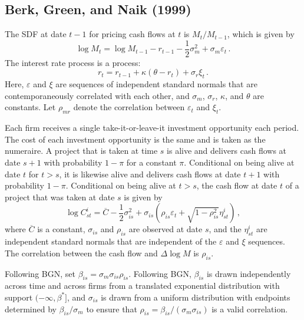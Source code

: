 \clearpage
\appendixpage
\begin{appendices}



\section{Berk, Green, and Naik (1999)}


The SDF at date $t-1$ for pricing cash flows at $t$ is $M_t/M_{t-1}$, which is given by
\begin{equation}\label{logsdf}
\log M_{t} = \log M_{t-1} - r_{t-1} - \frac{1}{2}\sigma_m^2 + \sigma_m \varepsilon_{t}\,.
\end{equation}
The interest rate process is a \cite{vasicek} process:
\begin{equation}\label{interestrate}
r_{t} = r_{t-1} + \kappa(\theta - r_t) + \sigma_r \xi_{t}\,.
\end{equation}
Here, $\varepsilon$ and $\xi$ are sequences of independent standard normals that are contemporaneously correlated with each other, and $\sigma_m$, $\sigma_r$, $\kappa$, and $\theta$ are constants.  Let $\rho_{mr}$ denote the correlation between $\varepsilon_t$ and $\xi_t$.

Each firm receives a single take-it-or-leave-it investment opportunity each period.  The cost of each investment opportunity is the same and is taken as the numeraire.  A project that is taken at time $s$ is alive and delivers cash flows at date $s+1$ with probability $1-\pi$ for a constant $\pi$.  Conditional on being alive at date $t$ for $t>s$, it is likewise alive and delivers cash flows at date $t+1$ with probability $1-\pi$.  Conditional on being alive at $t>s$, the cash flow at date $t$ of a project that was taken at date $s$ is given by
\begin{equation}\label{cashflow}
\log C_{st}^i = \overline{C} - \frac{1}{2} \sigma_{is}^2 +  \sigma_{is} \left(\rho_{is} \varepsilon_{t} + \sqrt{1 - \rho_{is}^2} \eta_{st}^i\right)\,,
\end{equation}
where $\overline{C}$ is a constant, $\sigma_{is}$ and $\rho_{is}$ are observed at date $s$, and the $\eta_{st}^i$ are independent standard normals that are independent of the $\varepsilon$ and $\xi$ sequences.  The correlation between the cash flow and  $\Delta \log M$ is $\rho_{is}$.  

Following BGN, set $\beta_{is} = \sigma_m\sigma_{is}\rho_{is}$.   Following BGN, $\beta_{is}$ is drawn independently across time and across firms from a translated exponential distribution with support $(-\infty, \beta^*]$, and $\sigma_{is}$ is drawn from a uniform distribution with endpoints determined by $\beta_{is}/\sigma_m$ to ensure that $\rho_{is} = \beta_{is}/(\sigma_m\sigma_{is})$ is a valid correlation.


\end{appendices}
